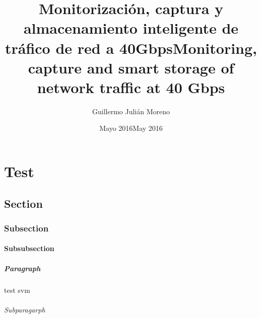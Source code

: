\documentclass[twoside]{epstfg}
\title[spa]{Monitorización, captura y almacenamiento inteligente de tráfico de red a 40Gbps}
\title[eng]{Monitoring, capture and smart storage of network traffic at 40 Gbps}
\author{Guillermo Julián Moreno}
\date[spa]{Mayo 2016}
\date[eng]{May 2016}
\begin{document}

\frontmatter

\maketitle[spa]
\maketitle[eng]

\makeinnertitle[spa]
\makeinnertitle[eng]

\makeabstract[spa]
\makeabstract[eng]

\printnoidxglossaries
\clearpage

\tableofcontents
\clearpage
\listoftables
\clearpage
\listoffigures
\cleardoublepage

\mainmatter

\chapter{Test}
\section{Section}
\subsection{Subsection}
\subsubsection{Subsubsection}
\paragraph{Paragraph}

\lipsum[2]

\gls{test} \gls{svm}

\subparagraph{Subparagarph}

\lipsum[1-20]
\end{document}
